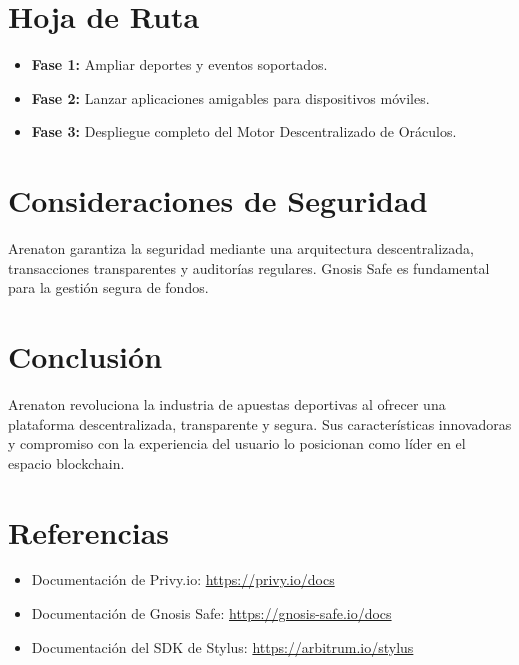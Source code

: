 \documentclass[11pt,twocolumn]{article}
\begin{document}
\section{Hoja de Ruta}
\begin{itemize}[itemsep=0.5em]
    \item \textbf{Fase 1:} Ampliar deportes y eventos soportados.
    \item \textbf{Fase 2:} Lanzar aplicaciones amigables para dispositivos móviles.
    \item \textbf{Fase 3:} Despliegue completo del Motor Descentralizado de Oráculos.
\end{itemize}

\section{Consideraciones de Seguridad}
Arenaton garantiza la seguridad mediante una arquitectura descentralizada, transacciones transparentes y auditorías regulares. Gnosis Safe es fundamental para la gestión segura de fondos.

\section{Conclusión}
Arenaton revoluciona la industria de apuestas deportivas al ofrecer una plataforma descentralizada, transparente y segura. Sus características innovadoras y compromiso con la experiencia del usuario lo posicionan como líder en el espacio blockchain.

\section*{Referencias}
\begin{itemize}[itemsep=0.5em]
    \item Documentación de Privy.io: \url{https://privy.io/docs}
    \item Documentación de Gnosis Safe: \url{https://gnosis-safe.io/docs}
    \item Documentación del SDK de Stylus: \url{https://arbitrum.io/stylus}
\end{itemize}
\end{document}
